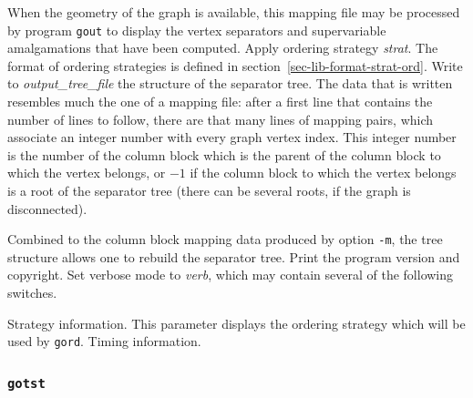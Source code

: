 \begin{itemize}
\begin{itemize}
When the geometry of the graph is available, this mapping file may be
processed by program \texttt{gout} to display the vertex separators and
supervariable amalgamations that have been computed.
Apply ordering strategy {\it strat}. The format of ordering
strategies is defined in section~\ref{sec-lib-format-strat-ord}.
Write to {\it output\_tree\_file\/} the structure of the separator
tree. The data that is written resembles much the one of a mapping
file: after a first line that contains the number of lines to follow,
there are that many lines of mapping pairs, which associate an integer
number with every graph vertex index. This integer number is the
number of the column block which is the parent of the column block to
which the vertex belongs, or $-1$ if the column block to which the
vertex belongs is a root of the separator tree (there can be several
roots, if the graph is disconnected).

Combined to the column block mapping data produced by option \texttt{-m},
the tree structure allows one to rebuild the separator tree.
\iteme[\texttt{-V}]
Print the program version and copyright.
Set verbose mode to {\it verb}, which may contain several of the following
switches.
\begin{itemize}
\iteme[\texttt{s}]
Strategy information. This parameter displays the ordering
strategy which will be used by \texttt{gord}.
\iteme[\texttt{t}]
Timing information.
\end{itemize}
\end{itemize}
\end{itemize}

\subsubsection{\texttt{gotst}}
\label{sec-prog-gotst}

